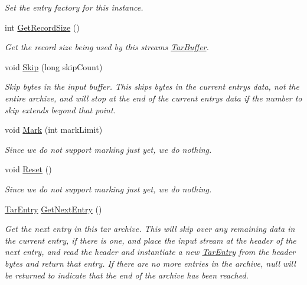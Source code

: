 \begin{DoxyCompactItemize}
\begin{DoxyCompactList}\small\item\em Set the entry factory for this instance. \end{DoxyCompactList}\item 
int \hyperlink{class_i_c_sharp_code_1_1_sharp_zip_lib_1_1_tar_1_1_tar_input_stream_af1b1981acd96ff1e46b278a68a89ea80}{Get\+Record\+Size} ()
\begin{DoxyCompactList}\small\item\em Get the record size being used by this stream\textquotesingle{}s \hyperlink{class_i_c_sharp_code_1_1_sharp_zip_lib_1_1_tar_1_1_tar_buffer}{Tar\+Buffer}. \end{DoxyCompactList}\item 
void \hyperlink{class_i_c_sharp_code_1_1_sharp_zip_lib_1_1_tar_1_1_tar_input_stream_a5655d5d9c6aff286c0efa3cba12db494}{Skip} (long skip\+Count)
\begin{DoxyCompactList}\small\item\em Skip bytes in the input buffer. This skips bytes in the current entry\textquotesingle{}s data, not the entire archive, and will stop at the end of the current entry\textquotesingle{}s data if the number to skip extends beyond that point. \end{DoxyCompactList}\item 
void \hyperlink{class_i_c_sharp_code_1_1_sharp_zip_lib_1_1_tar_1_1_tar_input_stream_afd48ac983df597a6b5f1e7ecc175a28d}{Mark} (int mark\+Limit)
\begin{DoxyCompactList}\small\item\em Since we do not support marking just yet, we do nothing. \end{DoxyCompactList}\item 
void \hyperlink{class_i_c_sharp_code_1_1_sharp_zip_lib_1_1_tar_1_1_tar_input_stream_a159d2d270fcaf85aabdf61a0fae6878c}{Reset} ()
\begin{DoxyCompactList}\small\item\em Since we do not support marking just yet, we do nothing. \end{DoxyCompactList}\item 
\hyperlink{class_i_c_sharp_code_1_1_sharp_zip_lib_1_1_tar_1_1_tar_entry}{Tar\+Entry} \hyperlink{class_i_c_sharp_code_1_1_sharp_zip_lib_1_1_tar_1_1_tar_input_stream_ad1c9380146d8de1f637e7a41868b765d}{Get\+Next\+Entry} ()
\begin{DoxyCompactList}\small\item\em Get the next entry in this tar archive. This will skip over any remaining data in the current entry, if there is one, and place the input stream at the header of the next entry, and read the header and instantiate a new \hyperlink{class_i_c_sharp_code_1_1_sharp_zip_lib_1_1_tar_1_1_tar_entry}{Tar\+Entry} from the header bytes and return that entry. If there are no more entries in the archive, null will be returned to indicate that the end of the archive has been reached. \end{DoxyCompactList}\item 

\end{DoxyCompactItemize}
